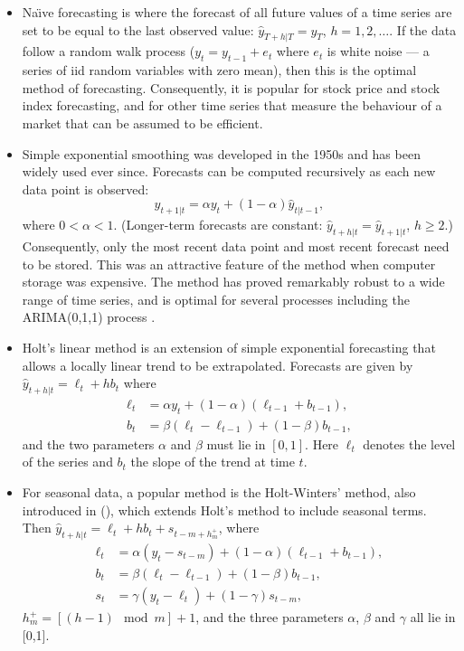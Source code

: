 \documentclass[a4paper,10pt]{article}
\begin{document}
\begin{itemize}
	\item Na\"{\i}ve forecasting is where the forecast of all future values of a time series are set to be equal to the last observed value: $\hat{y}_{T+h|T}=y_T$, $h=1,2,\dots$. If the data follow a random walk process ($y_t=y_{t-1}+e_t$ where $e_t$ is white noise --- a series of iid random variables with zero mean), then this is the optimal method of forecasting. Consequently, it is popular for stock price and stock index forecasting, and for other time series that measure the behaviour of a market that can be assumed to be efficient.

	\item Simple exponential smoothing was developed in the 1950s \citep{Brown59} and has been widely used ever since. Forecasts can be computed recursively as each new data point is observed:
	      \[
		      \hat{y}_{t+1|t} = \alpha y_t + (1-\alpha)\hat{y}_{t|t-1},
	      \]
	      where $0<\alpha<1$. (Longer-term forecasts are constant: $\hat{y}_{t+h|t} = \hat{y}_{t+1|t}$, $h\ge2$.)
	      Consequently, only the most recent data point and most recent forecast need to be stored. This was an attractive feature of the method when computer storage was expensive. The method has proved remarkably robust to a wide range of time series, and is optimal for several processes including the ARIMA(0,1,1) process \citep{CKOS01}.

	\item Holt's linear method \citep{Holt57} is an extension of simple exponential forecasting that allows a locally linear trend to be extrapolated. Forecasts are given by $\hat{y}_{t+h|t} = \ell_t + hb_t$ where
	      \begin{align*}
		      \ell_t & = \alpha y_t + (1-\alpha)(\ell_{t-1} + b_{t-1}), \\
		      b_t    & = \beta(\ell_t-\ell_{t-1}) + (1-\beta)b_{t-1},
	      \end{align*}
	      and the two parameters $\alpha$ and $\beta$ must lie in $[0,1]$. Here $\ell_t$ denotes the level of the series and $b_t$ the slope of the trend at time $t$.

	\item For seasonal data, a popular method is the Holt-Winters' method, also introduced in \citeauthor{Holt57} (\citeyear{Holt57}), which extends Holt's method to include seasonal terms. Then $\hat{y}_{t+h|t} = \ell_t + hb_t + s_{t-m+h_m^+}$, where
    \begin{align*}
      \ell_t & = \alpha (y_t -s_{t-m}) + (1-\alpha)(\ell_{t-1} + b_{t-1}), \\
      b_t    & = \beta(\ell_t-\ell_{t-1}) + (1-\beta)b_{t-1},              \\
      s_t    & = \gamma(y_t-\ell_t)+(1-\gamma)s_{t-m},
    \end{align*}
    $h_m^+ = [(h-1)\mod m]+1$, and the three parameters $\alpha$, $\beta$ and $\gamma$ all lie in [0,1].
\end{itemize}
\end{document}
